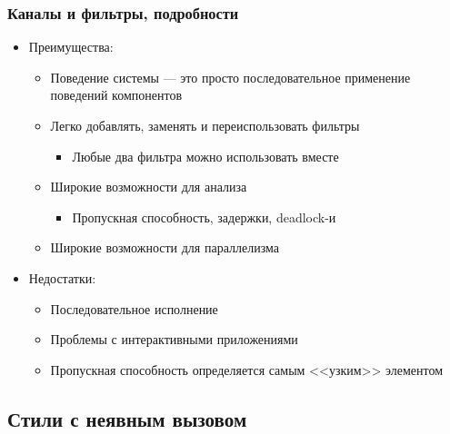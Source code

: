 \documentclass[xetex,mathserif,serif]{beamer}
\begin{document}
    \begin{frame}
        \frametitle{Каналы и фильтры, подробности}
        \begin{itemize}
            \item Преимущества:
            \begin{itemize}
                \item Поведение системы --- это просто последовательное применение поведений компонентов
                \item Легко добавлять, заменять и переиспользовать фильтры
                \begin{itemize}
                    \item Любые два фильтра можно использовать вместе
                \end{itemize}
                \item Широкие возможности для анализа
                \begin{itemize}
                    \item Пропускная способность, задержки, deadlock-и
                \end{itemize}
                \item Широкие возможности для параллелизма
            \end{itemize}
            \item Недостатки:
            \begin{itemize}
                \item Последовательное исполнение
                \item Проблемы с интерактивными приложениями
                \item Пропускная способность определяется самым <<узким>> элементом
            \end{itemize}
        \end{itemize}
    \end{frame}

    \subsection{Стили с неявным вызовом}
\end{document}
